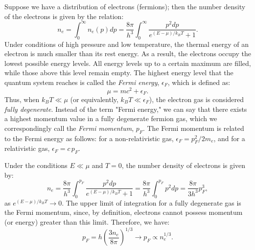 \documentclass[main.tex]{subfiles}
\begin{document}
Suppose we have a distribution of electrons (fermions); then the number density of the electrons is given by the relation:
\begin{equation}
    n_e = \int_0^{\infty} n_e (p) dp =  \frac{8\pi}{h^3} \int_0^{\infty} \frac{p^2 dp}{e^{(E - \mu)/k_B T} + 1}.
\end{equation}
Under conditions of high pressure and low temperature, the thermal energy of an electron is much smaller than its rest energy. As a result, the electrons occupy the lowest possible energy levels. All energy levels up to a certain maximum are filled, while those above this level remain empty. The highest energy level that the quantum system reaches is called the \textit{Fermi energy}, $\epsilon_F$, which is defined as:
$$\mu = mc^2 + \epsilon_F.$$
Thus, when $k_B T \ll \mu$ (or equivalently, $k_B T \ll \epsilon_F$), the electron gas is considered \textit{fully degenerate}.
Instead of the term "Fermi energy," we can say that there exists a highest momentum value in a fully degenerate fermion gas, which we correspondingly call the \textit{Fermi momentum}, $p_F$. The Fermi momentum is related to the Fermi energy as follows: for a non-relativistic gas, $\epsilon_F = p_F^2 / 2m_e$, and for a relativistic gas, $\epsilon_F = c\,p_F$.

Under the conditions $E \ll \mu$ and $T = 0$, the number density of electrons is given by:
\begin{equation}
    \label{apx:electron_number_density_degenerate_gas}
    n_e = \frac{8\pi}{h^3} \int_0^{p_F} \frac{p^2 dp}{e^{(E - \mu)/k_B T} + 1} = \frac{8\pi}{h^3} \int_0^{p_F} p^2 dp = \frac{8\pi}{3h^3} p_F^3,
\end{equation}
as $e^{(E - \mu)/k_B T} \rightarrow 0$. The upper limit of integration for a fully degenerate gas is the Fermi momentum, since, by definition, electrons cannot possess momentum (or energy) greater than this limit. Therefore, we have:
\begin{equation}
    \label{apx:eq:fermi_momentum}
    p_F = h \left( \frac{3 n_e}{8 \pi} \right)^{1/3} \longrightarrow p_F \propto n_e^{1/3}.
\end{equation}
\end{document}
